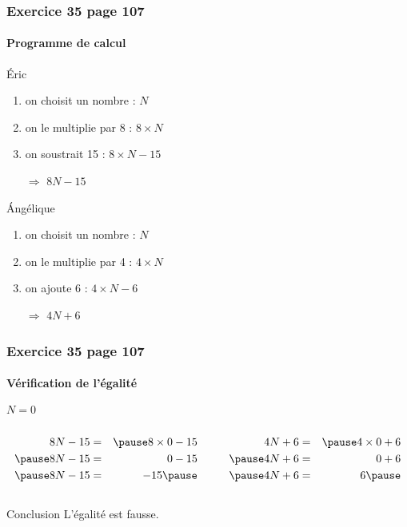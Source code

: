 \documentclass[xcolor={dvipsnames}]{beamer}
\begin{document}
\begin{frame}
	\frametitle{Exercice 35 page 107}
	\framesubtitle{Programme de calcul}
	
	\begin{block}{\'Eric}
		\begin{enumerate}
			\item on choisit un nombre \pause : $N$ \pause
			\item on le multiplie par 8 \pause : $8 \times N$ \pause
			\item on soustrait 15 \pause : $8 \times N - 15$ \pause
			\item[$\Rightarrow$] $8N - 15$ \pause
		\end{enumerate}
	\end{block}
	
	\begin{block}{\'Angélique}
		\begin{enumerate}
			\item on choisit un nombre \pause : $N$ \pause
			\item on le multiplie par 4 \pause : $4 \times N$ \pause
			\item on ajoute 6 \pause : $4 \times N - 6$ \pause
			\item[$\Rightarrow$] $4N + 6$ 
		\end{enumerate}
	\end{block}
\end{frame}



\begin{frame}
	\frametitle{Exercice 35 page 107}
	\framesubtitle{Vérification de l'égalité}
	
	\begin{block}{$N = 0$}
		
		\begin{columns}
			\begin{column}{0.5\textwidth}
				\begin{eqnarray*}
					8N - 15 &=& \pause 8 \times 0 - 15 \\ \pause
					8N - 15 &=& 0 - 15 \\ \pause
					8N - 15 &=& -15 \pause
				\end{eqnarray*}
			\end{column}
		
		
			\begin{column}{0.5\textwidth}
				\begin{eqnarray*}
					4N + 6 &=& \pause 4 \times 0 + 6 \\ \pause
					4N + 6 &=& 0 + 6 \\ \pause
					4N + 6 &=& 6 \pause
				\end{eqnarray*}
			\end{column}
		\end{columns}
		
	\end{block}

	\begin{alertblock}{Conclusion}
		L'égalité est fausse.
	\end{alertblock}
\end{frame}
\end{document}
